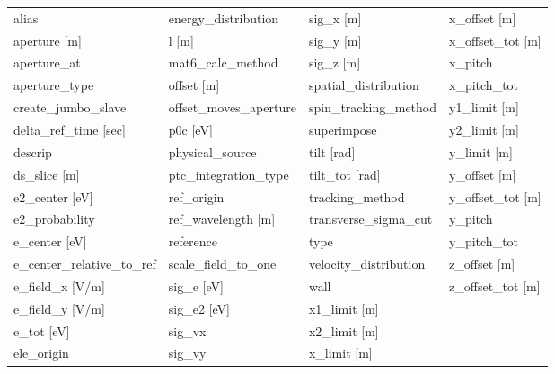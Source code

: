  \begin{tabular}{llll} \toprule
alias                          & energy_distribution            & sig_x [m]                      & x_offset [m]                   \\
aperture [m]                   & l [m]                          & sig_y [m]                      & x_offset_tot [m]               \\
aperture_at                    & mat6_calc_method               & sig_z [m]                      & x_pitch                        \\
aperture_type                  & offset [m]                     & spatial_distribution           & x_pitch_tot                    \\
create_jumbo_slave             & offset_moves_aperture          & spin_tracking_method           & y1_limit [m]                   \\
delta_ref_time [sec]           & p0c [eV]                       & superimpose                    & y2_limit [m]                   \\
descrip                        & physical_source                & tilt [rad]                     & y_limit [m]                    \\
ds_slice [m]                   & ptc_integration_type           & tilt_tot [rad]                 & y_offset [m]                   \\
e2_center [eV]                 & ref_origin                     & tracking_method                & y_offset_tot [m]               \\
e2_probability                 & ref_wavelength [m]             & transverse_sigma_cut           & y_pitch                        \\
e_center [eV]                  & reference                      & type                           & y_pitch_tot                    \\
e_center_relative_to_ref       & scale_field_to_one             & velocity_distribution          & z_offset [m]                   \\
e_field_x [V/m]                & sig_e [eV]                     & wall                           & z_offset_tot [m]               \\
e_field_y [V/m]                & sig_e2 [eV]                    & x1_limit [m]                   &                                \\
e_tot [eV]                     & sig_vx                         & x2_limit [m]                   &                                \\
ele_origin                     & sig_vy                         & x_limit [m]                    &                                \\
 \bottomrule
 \end{tabular}
 \vfill

